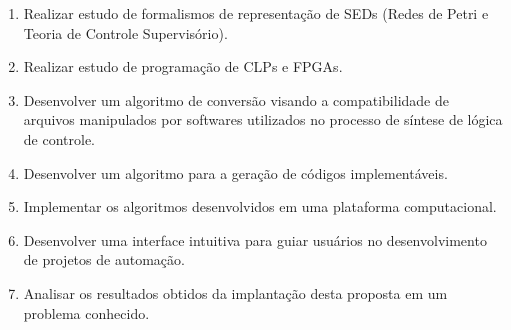 \begin{enumerate}
	\item Realizar estudo de formalismos de representa\c{c}\~ao de SEDs (Redes de Petri e Teoria de Controle Supervis\'orio).
	
	\item Realizar estudo de programa\c{c}\~ao de CLPs e FPGAs.
	
	\item Desenvolver um algoritmo de convers\~ao visando a compatibilidade de arquivos manipulados por softwares utilizados no processo de s\'intese de l\'ogica de controle.
	
	\item Desenvolver um algoritmo para a gera\c{c}\~ao de c\'odigos implement\'aveis.
	
	\item Implementar os algoritmos desenvolvidos em uma plataforma computacional.
	
	\item Desenvolver uma interface intuitiva para guiar usu\'arios no desenvolvimento de projetos de automa\c{c}\~ao.
	
	\item Analisar os resultados obtidos da implanta\c{c}\~ao desta proposta em um problema conhecido.
\end{enumerate} 
